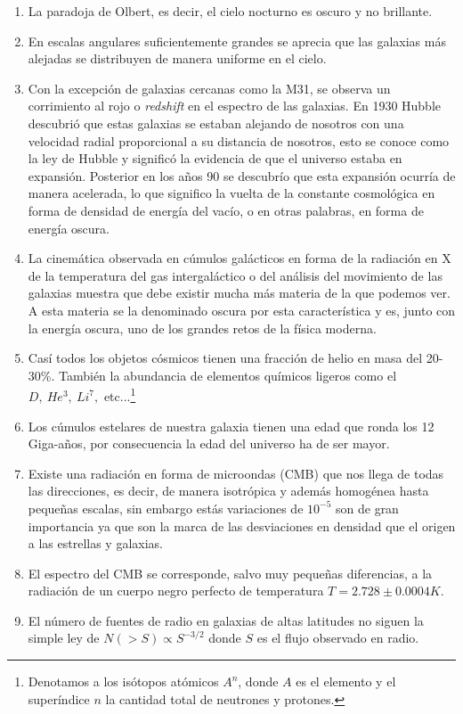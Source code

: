 \begin{enumerate}
\item La paradoja de Olbert, es decir, el cielo nocturno es oscuro y no brillante.
\item En escalas angulares suficientemente grandes se aprecia que las galaxias más alejadas se distribuyen de manera uniforme en el cielo.
\item Con la excepción de galaxias cercanas como la M31, se observa un corrimiento al rojo o \textit{redshift} en el espectro de las galaxias. En 1930 Hubble descubrió que estas galaxias se estaban alejando de nosotros con una velocidad radial proporcional a su distancia de nosotros, esto se conoce como la ley de Hubble y significó la evidencia de que el universo estaba en expansión. Posterior en los años 90 se descubrío que esta expansión ocurría de manera acelerada, lo que significo la vuelta de la constante cosmológica en forma de densidad de energía del vacío, o en otras palabras, en forma de energía oscura.
\item La cinemática observada en cúmulos galácticos en forma de la radiación en X de la temperatura del gas intergaláctico o del análisis del movimiento de las galaxias muestra que debe existir mucha más materia de la que podemos ver. A esta materia se la denominado oscura por esta característica y es, junto con la energía oscura, uno de los grandes retos de la física moderna.
\item Casí todos los objetos cósmicos tienen una fracción de helio en masa del 20-30\%. También la abundancia de elementos químicos ligeros como el $D,\ He^3,\ Li^7,$ etc...\footnote{Denotamos a los isótopos atómicos $A^n$, donde $A$ es el elemento y el superíndice $n$ la cantidad total de neutrones y protones.}
\item Los cúmulos estelares de nuestra galaxia tienen una edad que ronda los 12 Giga-años, por consecuencia la edad del universo ha de ser mayor.
\item Existe una radiación en forma de microondas (CMB) que nos llega de todas las direcciones, es decir, de manera isotrópica y además homogénea hasta pequeñas escalas, sin embargo estás variaciones de $10^{-5}$ son de gran importancia ya que son la marca de las desviaciones en densidad que  el origen a las estrellas y galaxias.
\item El espectro del CMB se corresponde, salvo muy pequeñas diferencias, a la radiación de un cuerpo negro perfecto de temperatura $T=2.728\pm 0.0004K$.
\item El número de fuentes de radio en galaxias de altas latitudes no siguen la simple ley de $N(>S)\propto S^{-3/2}$ donde $S$ es el flujo observado en radio.
\end{enumerate}

